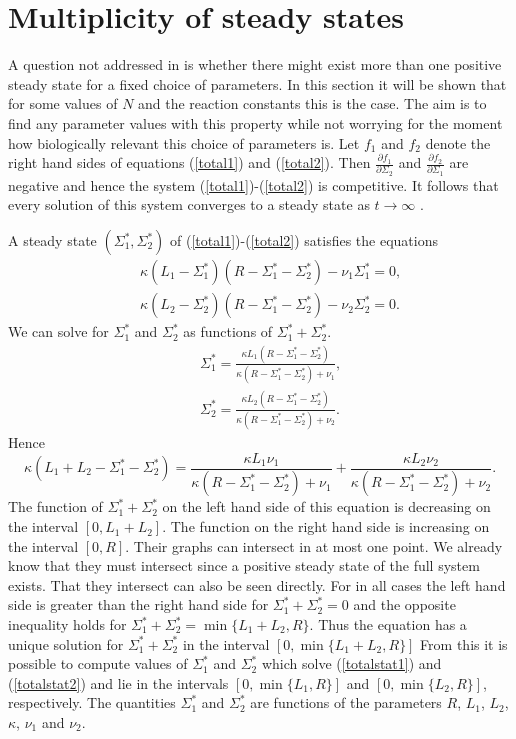\documentclass{article}
\begin{document}
\section{Multiplicity of steady states}\label{steady}

A question not addressed in \cite{francois13} is whether there might exist 
more than one positive steady state for a fixed choice of parameters. In this 
section it will be shown that for some values of $N$ and the reaction 
constants this is the case. The aim is to find any parameter values with this 
property while not worrying for the moment how biologically relevant this 
choice of parameters is. Let $f_1$ and $f_2$ denote the right hand sides of
equations (\ref{total1}) and (\ref{total2}). Then 
$\frac{\partial f_1}{\partial\Sigma_2}$ and 
$\frac{\partial f_2}{\partial\Sigma_1}$ are negative and hence the system
(\ref{total1})-(\ref{total2}) is competitive. It follows that every solution
of this system converges to a steady state as $t\to\infty$ \cite{hirsch05}. 

A steady state $(\Sigma_1^*,\Sigma_2^*)$ of (\ref{total1})-(\ref{total2}) 
satisfies the equations
\begin{eqnarray}
&&\kappa(L_1-\Sigma_1^*)(R-\Sigma_1^*-\Sigma_2^*)-\nu_1\Sigma_1^*=0
\label{totalstat1},\\
&&\kappa(L_2-\Sigma_2^*)(R-\Sigma_1^*-\Sigma_2^*)-\nu_2\Sigma_2^*=0
\label{totalstat2}.
\end{eqnarray}
We can solve for $\Sigma_1^*$ and $\Sigma_2^*$ as functions of 
$\Sigma_1^*+\Sigma_2^*$.
\begin{eqnarray}
&&\Sigma_1^*=\frac{\kappa L_1(R-\Sigma_1^*-\Sigma_2^*)}
{\kappa (R-\Sigma_1^*-\Sigma_2^*)+\nu_1},\\
&&\Sigma_2^*=\frac{\kappa L_2(R-\Sigma_1^*-\Sigma_2^*)}
{\kappa (R-\Sigma_1^*-\Sigma_2^*)+\nu_2}.
\end{eqnarray}
Hence
\begin{equation}
\kappa (L_1+L_2-\Sigma_1^*-\Sigma_2^*)
=\frac{\kappa L_1\nu_1}{\kappa (R-\Sigma_1^*-\Sigma_2^*)+\nu_1}
+\frac{\kappa L_2\nu_2}{\kappa (R-\Sigma_1^*-\Sigma_2^*)+\nu_2}.
\end{equation}
The function of $\Sigma_1^*+\Sigma_2^*$ on the left hand side of this equation 
is decreasing on the interval $[0,L_1+L_2]$. The function on the right hand 
side is increasing on the interval $[0,R]$. Their graphs can intersect in at 
most one point. We already know that they must intersect since a positive
steady state of the full system exists. That they intersect can also be seen 
directly. For in all cases the left hand side is greater than the right hand
side for $\Sigma_1^*+\Sigma_2^*=0$ and the opposite inequality holds for
$\Sigma_1^*+\Sigma_2^*=\min\{L_1+L_2,R\}$. Thus the equation has a unique 
solution for $\Sigma_1^*+\Sigma_2^*$ in the interval $[0,\min\{L_1+L_2,R\}]$
From this it is possible to compute values of $\Sigma_1^*$ and 
$\Sigma_2^*$ which solve (\ref{totalstat1}) and  (\ref{totalstat2})
and lie in the intervals $[0,\min\{L_1,R\}]$ and $[0,\min\{L_2,R\}]$, 
respectively. The quantities $\Sigma_1^*$ and $\Sigma_2^*$ are functions of the 
parameters $R$, $L_1$, $L_2$, $\kappa$, $\nu_1$ and $\nu_2$.
\end{document}
